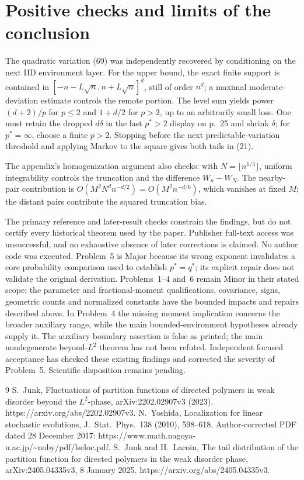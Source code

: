 \documentclass[10pt]{article}
\begin{document}
\section*{Positive checks and limits of the conclusion}
The quadratic variation (69) was independently recovered by conditioning on the next IID environment layer. For the upper bound, the exact finite support is contained in \([-n-L\sqrt n,n+L\sqrt n]^d\), still of order \(n^d\); a maximal moderate-deviation estimate controls the remote portion. The level sum yields power \((d+2)/p\) for \(p\leq2\) and \(1+d/2\) for \(p>2\), up to an arbitrarily small loss. One must retain the dropped \(d\delta\) in the last \(p^*>2\) display on p. 25 and shrink \(\delta\); for \(p^*=\infty\), choose a finite \(p>2\). Stopping before the next predictable-variation threshold and applying Markov to the square gives both tails in (21).\par
The appendix’s homogenization argument also checks: with \(N=\lfloor n^{1/3}\rfloor\), uniform integrability controls the truncation and the difference \(W_n-W_N\). The nearby-pair contribution is \(O(M^2N^dn^{-d/2})=O(M^2n^{-d/6})\), which vanishes at fixed \(M\); the distant pairs contribute the squared truncation bias.\par
The primary reference and later-result checks constrain the findings, but do not certify every historical theorem used by the paper. Publisher full-text access was unsuccessful, and no exhaustive absence of later corrections is claimed. No author code was executed. Problem 5 is Major because its wrong exponent invalidates a core probability comparison used to establish \(p^*=q^*\); its explicit repair does not validate the original derivation. Problems 1–4 and 6 remain Minor in their stated scope: the parameter and fractional-moment qualifications, covariance, signs, geometric counts and normalized constants have the bounded impacts and repairs described above. In Problem 4 the missing moment implication concerns the broader auxiliary range, while the main bounded-environment hypotheses already supply it. The auxiliary boundary assertion is false as printed; the main nondegenerate beyond-\(L^2\) theorem has not been refuted. Independent focused acceptance has checked these existing findings and corrected the severity of Problem 5. Scientific disposition remains pending.\par
9 S. Junk, Fluctuations of partition functions of directed polymers in weak disorder beyond the \(L^2\)-phase, arXiv:2202.02907v3 (2023). https://arxiv.org/abs/2202.02907v3. N. Yoshida, Localization for linear stochastic evolutions, J. Stat. Phys. 138 (2010), 598–618. Author-corrected PDF dated 28 December 2017: https://www.math.nagoya-u.ac.jp/\textasciitilde{}noby/pdf/lseloc.pdf. S. Junk and H. Lacoin, The tail distribution of the partition function for directed polymers in the weak disorder phase, arXiv:2405.04335v3, 8 January 2025. https://arxiv.org/abs/2405.04335v3.\par
\end{document}

